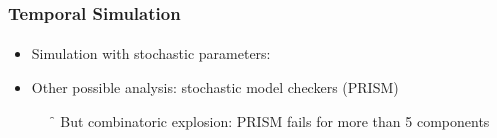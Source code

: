 \begin{frame}[c]
  \frametitle{Temporal Simulation}
  \framesubtitle{\tcite{\paulevephd}}

\begin{itemize}
  \item Simulation with stochastic parameters:
\end{itemize}

\medskip

\scalebox{.8}{}
\scalebox{.8}{}
\scalebox{.8}{}

\bigskip
\bigskip

\begin{itemize}
  \item Other possible analysis: stochastic model checkers (PRISM)
  \begin{itemize}
    \item[\f] But combinatoric explosion: PRISM fails for more than 5 components
  \end{itemize}

\end{itemize}

\end{frame}
